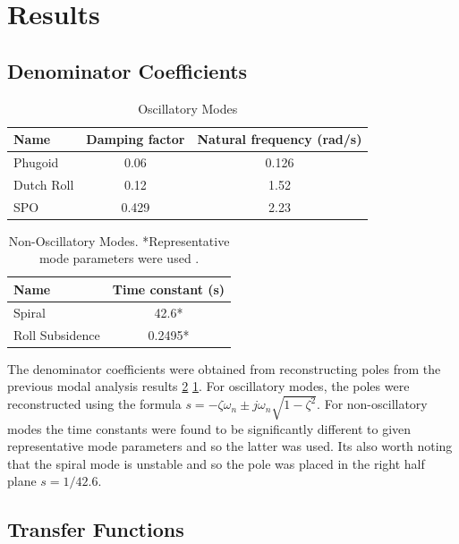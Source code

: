 \documentclass{article}
\begin{document}
\section{Results}


\subsection{Denominator Coefficients}

\begin{table}[H]
    \centering
    \begin{tabular}{lcc}
        \toprule
        Name & Damping factor & Natural frequency (rad/s) \\
        \midrule
        Phugoid & 0.06 & 0.126 \\
        Dutch Roll & 0.12 & 1.52 \\
        SPO & 0.429 & 2.23 \\
        \bottomrule
    \end{tabular}
    \caption{Oscillatory Modes}
      \label{tab:oscillatory_modes}
  \end{table}
  
  \begin{table}[H]
    \centering
    \begin{tabular}{lc}
        \toprule
        Name & Time constant (s) \\
        \midrule
        Spiral & 42.6* \\
        Roll Subsidence & 0.2495* \\
        \bottomrule
    \end{tabular}
    \caption{Non-Oscillatory Modes. *Representative mode parameters were used \cite{rep}.}
    \label{tab:non_oscillatory_modes}
  \end{table}

The denominator coefficients were obtained from reconstructing poles from the previous modal analysis results \ref{tab:non_oscillatory_modes} \ref{tab:oscillatory_modes}.
For oscillatory modes, the poles were reconstructed using the formula $s = -\zeta\omega_n \pm j\omega_n\sqrt{1-\zeta^2}$.
For non-oscillatory modes the time constants were found to be significantly different to given representative mode parameters \cite{rep} and so the latter was used.
Its also worth noting that the spiral mode is unstable and so the pole was placed in the right half plane $s = 1/42.6$.

\subsection{Transfer Functions}
\end{document}
